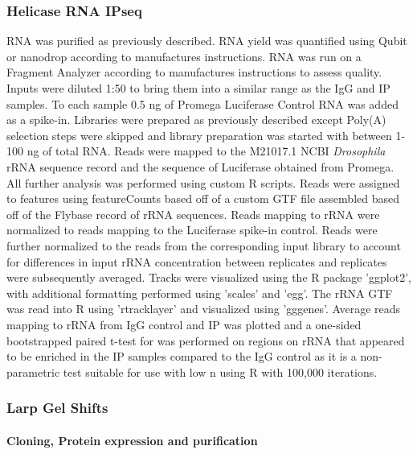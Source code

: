 \documentclass[12pt,oneside]{reedthesis}
\begin{document}
\hypertarget{helicase-rna-ipseq}{%
\subsubsection{Helicase RNA IPseq}\label{helicase-rna-ipseq}}

RNA was purified as previously described. RNA yield was quantified using Qubit or nanodrop according to manufactures instructions. RNA was run on a Fragment Analyzer according to manufactures instructions to assess quality. Inputs were diluted 1:50 to bring them into a similar range as the IgG and IP samples. To each sample 0.5 ng of Promega Luciferase Control RNA was added as a spike-in. Libraries were prepared as previously described except Poly(A) selection steps were skipped and library preparation was started with between 1-100 ng of total RNA. Reads were mapped to the M21017.1 NCBI \emph{Drosophila} rRNA sequence record and the sequence of Luciferase obtained from Promega. All further analysis was performed using custom R scripts. Reads were assigned to features using featureCounts based off of a custom GTF file assembled based off of the Flybase record of rRNA sequences. Reads mapping to rRNA were normalized to reads mapping to the Luciferase spike-in control. Reads were further normalized to the reads from the corresponding input library to account for differences in input rRNA concentration between replicates and replicates were subsequently averaged. Tracks were visualized using the R package 'ggplot2', with additional formatting performed using 'scales' and 'egg'. The rRNA GTF was read into R using 'rtracklayer' and visualized using 'gggenes'. Average reads mapping to rRNA from IgG control and IP was plotted and a one-sided bootstrapped paired t-test for was performed on regions on rRNA that appeared to be enriched in the IP samples compared to the IgG control as it is a non-parametric test suitable for use with low n using R with 100,000 iterations.

\hypertarget{larp-gel-shifts}{%
\subsubsection{Larp Gel Shifts}\label{larp-gel-shifts}}

\hypertarget{cloning-protein-expression-and-purification}{%
\paragraph{Cloning, Protein expression and purification}\label{cloning-protein-expression-and-purification}}
\end{document}
